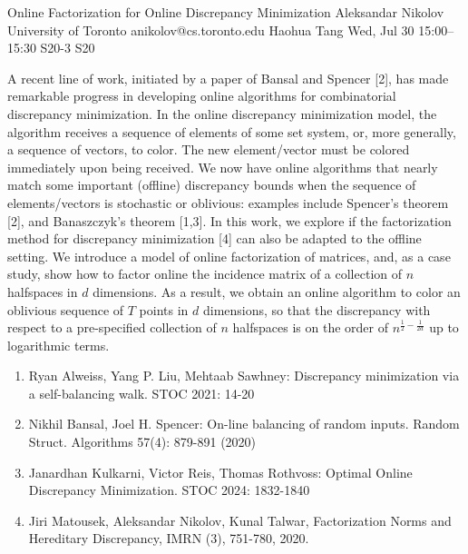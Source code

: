 \begin{talk}
  {Online Factorization for Online Discrepancy Minimization}%
  {Aleksandar Nikolov}%
  {University of Toronto}%
  {anikolov@cs.toronto.edu}%
  {Haohua Tang}%
  {}%
  {Wed, Jul 30 15:00--15:30}%
  {S20-3}%
  {S20}%
  
    
   
A recent line of work, initiated by a paper of Bansal and Spencer [2], has made remarkable progress in developing online algorithms for combinatorial discrepancy minimization. In the online discrepancy minimization model, the algorithm receives a sequence of elements of some set system, or, more generally, a sequence of vectors, to color. The new element/vector must be colored immediately upon being received. We now have online algorithms that nearly match some important (offline) discrepancy bounds when the sequence of elements/vectors is stochastic or oblivious: examples include Spencer's theorem [2], and Banaszczyk's theorem [1,3]. In this work, we explore if the factorization method for discrepancy minimization [4] can also be adapted to the offline setting. We introduce a model of online factorization of matrices, and, as a case study, show how to factor online the incidence matrix of a collection of $n$ halfspaces in $d$ dimensions. As a result, we obtain an online algorithm to color an oblivious sequence of $T$ points in $d$ dimensions, so that the discrepancy with respect to a pre-specified collection of $n$ halfspaces is on the order of $n^{\frac12 - \frac{1}{2d}}$ up to logarithmic terms. 

\medskip

\begin{enumerate}
    \item[{[1]}] Ryan Alweiss, Yang P. Liu, Mehtaab Sawhney:
Discrepancy minimization via a self-balancing walk. STOC 2021: 14-20

 \item[{[2]}] Nikhil Bansal, Joel H. Spencer:
On-line balancing of random inputs. Random Struct. Algorithms 57(4): 879-891 (2020)

    \item[{[3]}] Janardhan Kulkarni, Victor Reis, Thomas Rothvoss:
Optimal Online Discrepancy Minimization. STOC 2024: 1832-1840

    \item[{[4]}] Jiri Matousek, Aleksandar Nikolov, Kunal Talwar, Factorization Norms and Hereditary Discrepancy, IMRN (3), 751-780, 2020. 

\end{enumerate}
\end{talk}

